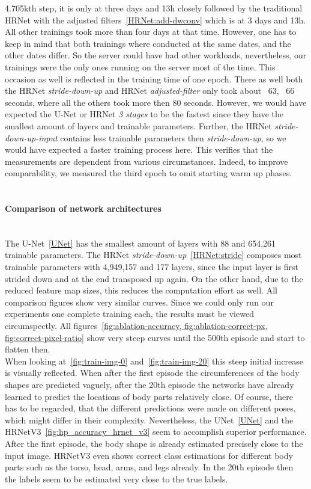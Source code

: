 4.705kth step, it is only at three days and 13h closely followed by the traditional HRNet with the adjusted filters~\ref{HRNet:add-dwconv}
which is at 3 days and 13h. All other trainings took more than four days at that time.
However, one has to keep in mind that both trainings where conducted at the same dates, and the other dates differ.
So the server could have had other workloads, nevertheless, our trainings were the only ones running on the server most
of the time. This occasion as well is reflected in the training time of one epoch.
There as well both the HRNet \textit{stride-down-up} and HRNet \textit{adjusted-filter} only took about ~63, ~66 seconds,
where all the others took more then 80 seconds.
However, we would have expected the U-Net or HRNet \textit{3 stages} to be the fastest since they have the smallest
amount of layers and trainable parameters.
Further, the HRNet \textit{stride-down-up-input} contains less trainable parameters then \textit{stride-down-up}, so
we would have expected a faster training process here.
This verifies that the measurements are dependent from various circumstances.
Indeed, to improve comparability, we measured the third epoch to omit starting warm up phases.
\\\mbox{}\\
\paragraph{Comparison of network architectures}\mbox{}\\
%
The U-Net~\ref{UNet} has the smallest amount of layers with 88 and 654,261 trainable parameters.
The HRNet \textit{stride-down-up}~\ref{HRNet:stride} composes most trainable parameters with 4,949,157 and 177 layers, since the input
layer is first strided down and at the end transposed up again.
On the other hand, due to the reduced feature map sizes, this reduces the computation effort as well.
All comparison figures show very similar curves.
Since we could only run our experiments one complete training each, the results must be viewed circumspectly.
All figures~\ref{fig:ablation-accuracy, fig:ablation-correct-px, fig:correct-pixel-ratio} show very steep curves until
the 500th episode and start to flatten then.\\
When looking at~\ref{fig:train-img-0} and~\ref{fig:train-img-20} this steep initial increase is visually reflected.
When after the first episode the circumferences of the body shapes are predicted vaguely, after the 20th episode the
networks have already learned to predict the locations of body parts relatively close.
Of course, there has to be regarded, that the different predictions were made on different poses, which might differ in
their complexity.
Nevertheless, the UNet~\ref{UNet} and the HRNetV3~\ref{fig:hp_accuracy_hrnet_v3} seem to accomplish superior performance.
After the first episode, the body shape is already estimated precisely close to the input image.
HRNetV3 even shows correct class estimations for different body parts such as the torso, head, arms, and legs already.
In the 20th episode then the labels seem to be estimated very close to the true labels.

